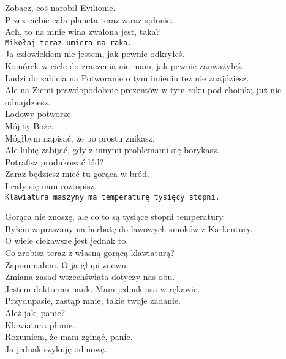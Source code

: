 \charmik{}
Zobacz, coś narobił Evilionie.\\
Przez ciebie cała planeta teraz zaraz spłonie.\\

\chardok{}
Ach, to na mnie wina zwalona jest, taka?\\
\texttt{Mikołaj teraz umiera na raka.}\\

\charmik{}
Ja człowiekiem nie jestem, jak pewnie odkryłeś.\\
Komórek w ciele do zraczenia nie mam, jak pewnie zauważyłeś.\\
Ludzi do zabicia na Potworanie o tym imieniu też nie znajdziesz.\\
Ale na Ziemi prawdopodobnie prezentów w tym roku pod choinką już nie odnajdziesz.\\

\chardok{}
Lodowy potworze. \\
Mój ty Boże. \\
Mógłbym napisać, że po prostu znikasz. \\
Ale lubię zabijać, gdy z innymi problemami się borykasz.\\
Potrafisz produkować lód?\\
Zaraz będziesz mieć tu gorąca w bród.\\
I cały się nam roztopisz.\\
\texttt{Klawiatura maszyny ma temperaturę tysięcy stopni.}\\


\charmik{}
Gorąca nie znoszę, ale co to są tysiące stopni temperatury.\\
Byłem zapraszany na herbatę do lawowych smoków z Karkentury.\\
O wiele ciekawsze jest jednak to.\\
Co zrobisz teraz z własną gorącą klawiaturą?\\

\chardok{}
Zapomniałem. O ja głupi znowu.\\
Zmiana zasad wszechświata dotyczy nas obu.\\
Jestem doktorem nauk. Mam jednak asa w rękawie.\\
Przydupasie, zastąp mnie, takie twoje zadanie.\\

\charprzy{}
Ależ jak, panie?\\
Klawiatura płonie.\\
Rozumiem, że mam zginąć, panie.\\
Ja jednak szykuję odmowę.\\


